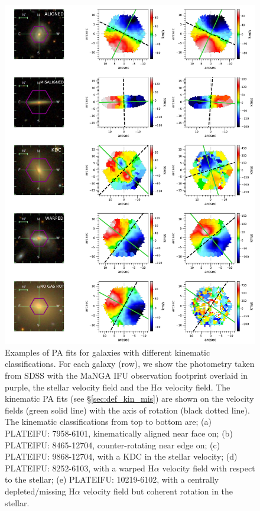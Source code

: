 \documentclass[fleqn,usenatbib]{mnras}
\begin{document}
\begin{figure}
	\includegraphics[width=0.8\linewidth]{misalignment_grid.pdf}
    \caption{Examples of PA fits for galaxies with different kinematic classifications. For each galaxy (row), we show the photometry taken from SDSS with the MaNGA IFU observation footprint overlaid in purple, the stellar velocity field and the H$\alpha$ velocity field. The kinematic PA fits (see \S\ref{sec:def_kin_mis}) are shown on the velocity fields (green solid line) with the axis of rotation (black dotted line). The kinematic classifications from top to bottom are; (a) PLATEIFU: 7958-6101, kinematically aligned near face on; (b) PLATEIFU: 8465-12704, counter-rotating near edge on; (c) PLATEIFU: 9868-12704, with a KDC in the stellar velocity; (d) PLATEIFU: 8252-6103, with a warped H$\alpha$ velocity field with respect to the stellar; (e) PLATEIFU: 10219-6102, with a centrally depleted/missing H$\alpha$ velocity field but coherent rotation in the stellar.}
    \label{fig:mis_grid}
\end{figure}
\end{document}
